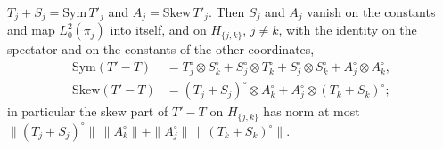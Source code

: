 \begin{lemma}
\begin{enumerate}[label=(\alph*)]
 $T_j+S_j=\mathrm{Sym}\,T'_j$ and $A_j=\mathrm{Skew}\,T'_j$. Then $S_j$ and
 $A_j$ vanish on the constants and map $L^2_0(\pi_j)$ into itself, and on
 $H_{\{j,k\}}$, $j\ne k$, with the identity on the spectator and on the
 constants of the other coordinates,
 \begin{align*}
  \mathrm{Sym}(T'-T)&=T^\circ_j\otimes S^\circ_k+S^\circ_j\otimes T^\circ_k
   +S^\circ_j\otimes S^\circ_k+A^\circ_j\otimes A^\circ_k,\\
  \mathrm{Skew}(T'-T)&=(T_j+S_j)^\circ\otimes A^\circ_k
   +A^\circ_j\otimes(T_k+S_k)^\circ;
 \end{align*}
 in particular the skew part of $T'-T$ on $H_{\{j,k\}}$ has norm at most
 $\|(T_j+S_j)^\circ\|\,\|A^\circ_k\|+\|A^\circ_j\|\,\|(T_k+S_k)^\circ\|$.
\end{enumerate}
\end{lemma}

